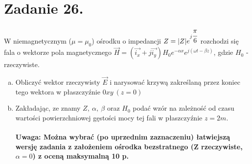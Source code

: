 \section*{Zadanie 26.}
\begin{task}
W niemagnetycznym ($\mu=\mu_{0}$) ośrodku o impedancji $Z=|Z|e^{j\cfrac{\pi}{6}}$ rozchodzi się
fala o wektorze pola magnetycznego $\vec{H}=(\vec{i_{x}} + j\vec{i_{y}})H_{0}e^{-\alpha x}e^{j(\omega t - \beta z)}$, gdzie $H_{0}$ - rzeczywiste.
\begin{enumerate}[a)]
\item Obliczyć wektor rzeczywisty $\vec{E}$ i narysować krzywą zakreślaną przez koniec
            tego wektora w płaszczyźnie $0xy \ (z=0)$ 
\item Zakładając, ze znamy $Z, \ \alpha, \ \beta $ oraz $H_{0}$ podać wzór na zależność 
            od czasu wartości powierzchniowej gęstości mocy tej fali w płaszczyźnie $z=2m$.\\ \\
\textbf{Uwaga: Można wybrać (po uprzednim zaznaczeniu) łatwiejszą wersję zadania z założeniem
ośrodka bezstratnego (Z rzeczywiste, $\alpha=0$) z oceną maksymalną 10 p.} \\
\end{enumerate}
\end{task}

